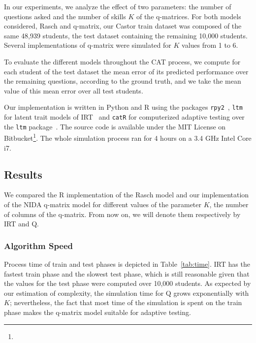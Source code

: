 \documentclass{sig-alternate}
\begin{document}
In our experiments, we analyze the effect of two parameters: the number of questions asked and the number of skills $K$ of the q-matrices. For both models considered, Rasch and q-matrix, our Castor train dataset was composed of the same 48,939 students, the test dataset containing the remaining 10,000 students. Several implementations of q-matrix were simulated for $K$ values from 1 to 6.

To evaluate the different models throughout the CAT process, we compute for each student of the test dataset the mean error of its predicted performance over the remaining questions, according to the ground truth, and we take the mean value of this mean error over all test students.

Our implementation is written in Python and R using the packages \texttt{rpy2}~\cite{Gautier2008}, \texttt{ltm} for latent trait models of IRT~\cite{Rizopoulos2006} and \texttt{catR} for computerized adaptive testing over the \texttt{ltm} package~\cite{MagisRaiche2012}. The source code is available under the MIT License on Bitbucket\footnote{}. The whole simulation process ran for 4 hours on a 3.4 GHz Intel Core i7. %

\subsection{Results}

We compared the R implementation of the Rasch model and our implementation of the NIDA q-matrix model for different values of the parameter $K$, the number of columns of the q-matrix. From now on, we will denote them respectively by IRT and Q.

\subsubsection{Algorithm Speed}

Process time of train and test phases is depicted in Table~\ref{tab:time}. IRT has the fastest train phase and the slowest test phase, which is still reasonable given that the values for the test phase were computed over 10,000 students. As expected by our estimation of complexity, the simulation time for Q grows exponentially with $K$; nevertheless, the fact that most time of the simulation is spent on the train phase makes the q-matrix model suitable for adaptive testing.
\end{document}
